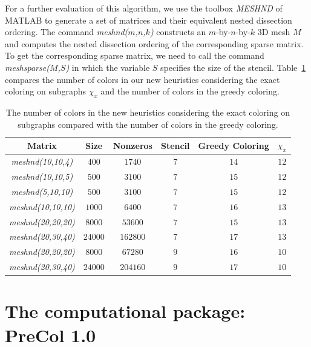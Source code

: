 \documentclass[12pt, twoside,a4paper,toc=bibliography]{scrbook}
\begin{document}
For a further evaluation of this algorithm, we use the toolbox \textit{MESHND}
of MATLAB to generate a set of matrices and their equivalent nested dissection ordering.
The command \textit{meshnd($m$,$n$,$k$)} constructs an $m$-by-$n$-by-$k$ 3D mesh $M$
and computes the nested dissection ordering of the corresponding sparse matrix.
To get the corresponding sparse matrix, we need to call the command 
\textit{meshsparse($M$,$S$)} in which the variable $S$ specifies the size
of the stencil.
Table~\ref{table.exact.greedy} compares the number of colors in our new 
heuristics considering the exact coloring on subgraphs $\chi_{x}$ and 
the number of colors in the greedy coloring.
\begin{table}
\centering
\begin{tabular}{|c|c|c|c|c|c|}
\hline
Matrix & Size & Nonzeros & Stencil & Greedy Coloring & $\chi_{x}$ \\\hline
\textit{meshnd(10,10,4)} & $400$ & $1740$ & $7$ & $14$ & $12$\\\hline
\textit{meshnd(10,10,5)} & $500$ & $3100$ & $7$ & $15$ & $12$\\\hline
\textit{meshnd(5,10,10)} & $500$ & $3100$ & $7$ & $15$ & $12$\\\hline
\textit{meshnd(10,10,10)} & $1000$ & $6400$ & $7$ & $16$ & $13$\\\hline
\textit{meshnd(20,20,20)} & $8000$ & $53600$ & $7$ & $15$ & $13$\\\hline
\textit{meshnd(20,30,40)} & $24000$ & $162800$ & $7$ & $17$ & $13$\\\hline
\textit{meshnd(20,20,20)} & $8000$ & $67280$ & $9$ & $16$ & $10$\\\hline
\textit{meshnd(20,30,40)} & $24000$ & $204160$ & $9$ & $17$ & $10$\\\hline
\end{tabular}
\caption{The number of colors in the new heuristics considering the exact coloring on subgraphs
compared with the number of colors in the greedy coloring.}
\label{table.exact.greedy}
\end{table}



\section{The computational package: PreCol 1.0}
\label{s.extend}
\end{document}
